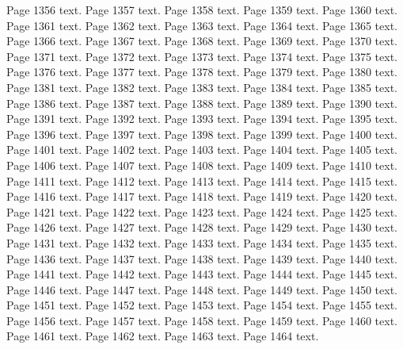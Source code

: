 \documentclass{article}
\begin{document}
Page 1356 text.\newpage
Page 1357 text.\newpage
Page 1358 text.\newpage
Page 1359 text.\newpage
Page 1360 text.\newpage
Page 1361 text.\newpage
Page 1362 text.\newpage
Page 1363 text.\newpage
Page 1364 text.\newpage
Page 1365 text.\newpage
Page 1366 text.\newpage
Page 1367 text.\newpage
Page 1368 text.\newpage
Page 1369 text.\newpage
Page 1370 text.\newpage
Page 1371 text.\newpage
Page 1372 text.\newpage
Page 1373 text.\newpage
Page 1374 text.\newpage
Page 1375 text.\newpage
Page 1376 text.\newpage
Page 1377 text.\newpage
Page 1378 text.\newpage
Page 1379 text.\newpage
Page 1380 text.\newpage
Page 1381 text.\newpage
Page 1382 text.\newpage
Page 1383 text.\newpage
Page 1384 text.\newpage
Page 1385 text.\newpage
Page 1386 text.\newpage
Page 1387 text.\newpage
Page 1388 text.\newpage
Page 1389 text.\newpage
Page 1390 text.\newpage
Page 1391 text.\newpage
Page 1392 text.\newpage
Page 1393 text.\newpage
Page 1394 text.\newpage
Page 1395 text.\newpage
Page 1396 text.\newpage
Page 1397 text.\newpage
Page 1398 text.\newpage
Page 1399 text.\newpage
Page 1400 text.\newpage
Page 1401 text.\newpage
Page 1402 text.\newpage
Page 1403 text.\newpage
Page 1404 text.\newpage
Page 1405 text.\newpage
Page 1406 text.\newpage
Page 1407 text.\newpage
Page 1408 text.\newpage
Page 1409 text.\newpage
Page 1410 text.\newpage
Page 1411 text.\newpage
Page 1412 text.\newpage
Page 1413 text.\newpage
Page 1414 text.\newpage
Page 1415 text.\newpage
Page 1416 text.\newpage
Page 1417 text.\newpage
Page 1418 text.\newpage
Page 1419 text.\newpage
Page 1420 text.\newpage
Page 1421 text.\newpage
Page 1422 text.\newpage
Page 1423 text.\newpage
Page 1424 text.\newpage
Page 1425 text.\newpage
Page 1426 text.\newpage
Page 1427 text.\newpage
Page 1428 text.\newpage
Page 1429 text.\newpage
Page 1430 text.\newpage
Page 1431 text.\newpage
Page 1432 text.\newpage
Page 1433 text.\newpage
Page 1434 text.\newpage
Page 1435 text.\newpage
Page 1436 text.\newpage
Page 1437 text.\newpage
Page 1438 text.\newpage
Page 1439 text.\newpage
Page 1440 text.\newpage
Page 1441 text.\newpage
Page 1442 text.\newpage
Page 1443 text.\newpage
Page 1444 text.\newpage
Page 1445 text.\newpage
Page 1446 text.\newpage
Page 1447 text.\newpage
Page 1448 text.\newpage
Page 1449 text.\newpage
Page 1450 text.\newpage
Page 1451 text.\newpage
Page 1452 text.\newpage
Page 1453 text.\newpage
Page 1454 text.\newpage
Page 1455 text.\newpage
Page 1456 text.\newpage
Page 1457 text.\newpage
Page 1458 text.\newpage
Page 1459 text.\newpage
Page 1460 text.\newpage
Page 1461 text.\newpage
Page 1462 text.\newpage
Page 1463 text.\newpage
Page 1464 text.\newpage
\end{document}
